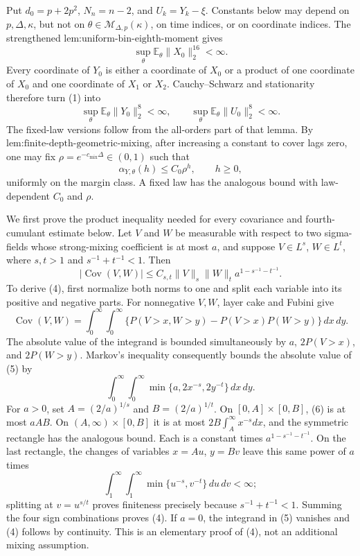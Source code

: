 Put \(d_0=p+2p^2\), \(N_n=n-2\), and \(U_k=Y_k-\xi\).  Constants below may depend on \(p,\Delta,\kappa\), but not on \(\theta\in\mathcal M_{\Delta,p}(\kappa)\), on time indices, or on coordinate indices.  The strengthened \(\text{lem:uniform-bin-eighth-moment}\) gives
\[
 \sup_\theta\mathbb E_\theta\lVert X_0\rVert_2^{16}<\infty.
\tag{1}
\]
Every coordinate of \(Y_0\) is either a coordinate of \(X_0\) or a product of one coordinate of \(X_0\) and one coordinate of \(X_1\) or \(X_2\).  Cauchy--Schwarz and stationarity therefore turn (1) into
\[
 \sup_\theta\mathbb E_\theta\lVert Y_0\rVert_2^8<\infty,
 \qquad
 \sup_\theta\mathbb E_\theta\lVert U_0\rVert_2^8<\infty.
\tag{2}
\]
The fixed-law versions follow from the all-orders part of that lemma.  By \(\text{lem:finite-depth-geometric-mixing}\), after increasing a constant to cover lags zero, one may fix \(\rho=e^{-c_{\mathrm{mix}}\Delta}\in(0,1)\) such that
\[
 \alpha_{Y,\theta}(h)\leq C_0\rho^h,
 \qquad h\geq0,
\tag{3}
\]
uniformly on the margin class.  A fixed law has the analogous bound with law-dependent \(C_0\) and \(\rho\).

We first prove the product inequality needed for every covariance and fourth-cumulant estimate below.  Let \(V\) and \(W\) be measurable with respect to two sigma-fields whose strong-mixing coefficient is at most \(a\), and suppose \(V\in L^s\), \(W\in L^t\), where \(s,t>1\) and \(s^{-1}+t^{-1}<1\).  Then
\[
 |\operatorname{Cov}(V,W)|
 \leq C_{s,t}\lVert V\rVert_s\lVert W\rVert_t
 a^{1-s^{-1}-t^{-1}}.
\tag{4}
\]
To derive (4), first normalize both norms to one and split each variable into its positive and negative parts.  For nonnegative \(V,W\), layer cake and Fubini give
\[
 \operatorname{Cov}(V,W)=
 \int_0^\infty\!\int_0^\infty
 \{P(V>x,W>y)-P(V>x)P(W>y)\}\,dx\,dy.
\tag{5}
\]
The absolute value of the integrand is bounded simultaneously by \(a\), \(2P(V>x)\), and \(2P(W>y)\).  Markov's inequality consequently bounds the absolute value of (5) by
\[
 \int_0^\infty\!\int_0^\infty
 \min\{a,2x^{-s},2y^{-t}\}\,dx\,dy.
\tag{6}
\]
For \(a>0\), set \(A=(2/a)^{1/s}\) and \(B=(2/a)^{1/t}\).  On \([0,A]\times[0,B]\), (6) is at most \(aAB\).  On \((A,\infty)\times[0,B]\) it is at most \(2B\int_A^\infty x^{-s}dx\), and the symmetric rectangle has the analogous bound.  Each is a constant times \(a^{1-s^{-1}-t^{-1}}\).  On the last rectangle, the changes of variables \(x=Au\), \(y=Bv\) leave this same power of \(a\) times
\[
 \int_1^\infty\!\int_1^\infty\min\{u^{-s},v^{-t}\}\,du\,dv<\infty;
\tag{7}
\]
splitting at \(v=u^{s/t}\) proves finiteness precisely because \(s^{-1}+t^{-1}<1\).  Summing the four sign combinations proves (4).  If \(a=0\), the integrand in (5) vanishes and (4) follows by continuity.  This is an elementary proof of (4), not an additional mixing assumption.

